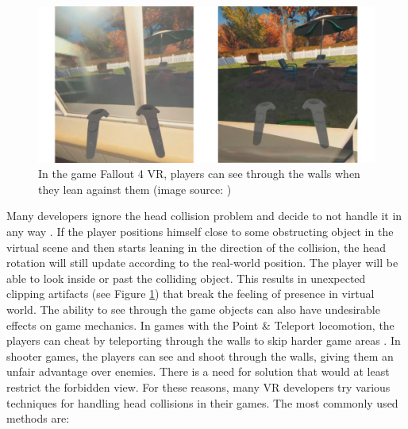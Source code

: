\begin{figure}[th]
\centering
\includegraphics[width=1\textwidth]{img/clipping.png}
\caption{In the game Fallout 4 VR, players can see through the walls when they lean against them (image source: \cite{redditfallout})}
\label{fig:FALLOUTCLIPPING}
\end{figure}

Many developers ignore the head collision problem and decide to not handle it in any way \cite{OCULUSDOCCLIPPING}. If the player positions himself close to some obstructing object in the virtual scene and then starts leaning in the direction of the collision, the head rotation will still update according to the real-world position. The player will be able to look inside or past the colliding object. This results in unexpected clipping artifacts (see Figure \ref{fig:FALLOUTCLIPPING}) that break the feeling of presence in virtual world. The ability to see through the game objects can also have undesirable effects on game mechanics. In games with the Point \& Teleport locomotion, the players can cheat by teleporting through the walls to skip harder game areas \cite{SKYRIMTELEPORT}. In shooter games, the players can see and shoot through the walls, giving them an unfair advantage over enemies. There is a need for solution that would at least restrict the forbidden view. For these reasons, many VR developers try various techniques for handling head collisions in their games. The most commonly used methods are:

